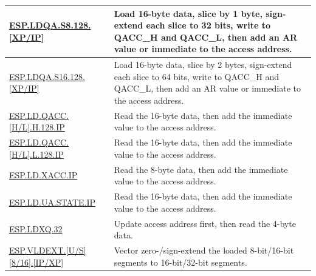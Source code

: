 \begin{longtable}[c]{|l|m{12cm}|}
    \\\hline
    \hyperref[instruction:ESPLDQAS8128XP]{ESP.LDQA.S8.128.[XP/IP]} & Load 16-byte data, slice by 1 byte, sign-extend each slice to 32 bits, write to QACC\_H and QACC\_L, then add an AR value or immediate to the access address.
    \\\hline
    \hyperref[instruction:ESPLDQAS16128XP]{ESP.LDQA.S16.128.[XP/IP]} & Load 16-byte data, slice by 2 bytes, sign-extend each slice to 64 bits, write to QACC\_H and QACC\_L, then add an AR value or immediate to the access address.
    \\\hline
    \hyperref[instruction:ESPLDQACC_HH128IP]{ESP.LD.QACC.[H/L].H.128.IP} & Read the 16-byte data, then add the immediate value to the access address.
    \\\hline
    \hyperref[instruction:ESPLDQACC_HL128IP]{ESP.LD.QACC.[H/L].L.128.IP} & Read the 16-byte data, then add the immediate value to the access address.
    \\\hline
    \hyperref[instruction:ESPLDXACCIP]{ESP.LD.XACC.IP} & Read the 8-byte data, then add the immediate value to the access address.
    \\\hline
    \hyperref[instruction:ESPLDUA_STATEIP]{ESP.LD.UA.STATE.IP} & Read the 16-byte data, then add the immediate value to the access address.
    \\\hline
    \hyperref[instruction:ESPLDXQ32]{ESP.LDXQ.32} & Update access address first, then read the 4-byte data.
    \\\hline

    \hyperref[instruction:ESPVLDEXTU8IP]{ESP.VLDEXT.[U/S][8/16].[IP/XP]} & Vector zero-/sign-extend the loaded 8-bit/16-bit segments to 16-bit/32-bit segments.
    \\\hline
    
\end{longtable}
